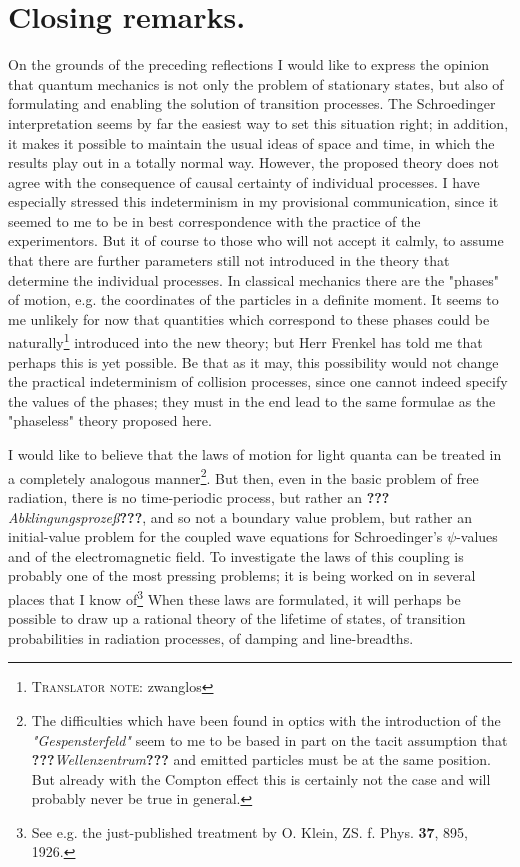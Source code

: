\documentclass[a4paper,11pt]{article}
\newcommand{\textbb}[1]{\textbf{#1}}
\newcommand{\WTF}[1]{\textbf{???}\textit{#1}\textbf{???}}
\newcommand{\?}[2]{#1\footnote{\textsc{Translator note}: #2}}
\begin{document}
\section{Closing remarks.} On the grounds of the preceding reflections I would like to express the opinion that quantum mechanics is not only the problem of stationary states, but also of formulating and enabling the solution of transition processes. The Schroedinger interpretation seems by far the easiest way to set this situation right; in addition, it makes it possible to maintain the usual ideas of space and time, in which the results play out in a totally normal way. However, the proposed theory does not agree with the consequence of causal certainty of individual processes. I have especially stressed this indeterminism in my provisional communication, since it seemed to me to be in best correspondence with the practice of the experimentors. But it of course to those who will not accept it calmly, to assume that there are further parameters still not introduced in the theory that determine the individual processes. In classical mechanics there are the "phases" of motion, e.g. the coordinates of the particles in a definite moment. It seems to me unlikely for now that quantities which correspond to these phases could be \?{naturally}{zwanglos} introduced into the new theory; but Herr Frenkel has told me that perhaps this is yet possible. Be that as it may, this possibility would not change the practical indeterminism of collision processes, since one cannot indeed specify the values of the phases; they must in the end lead to the same formulae as the "phaseless" theory proposed here.

I would like to believe that the laws of motion for light quanta can be treated in a completely analogous manner\footnote{The difficulties which have been found in optics with the introduction of the \textit{"Gespensterfeld"} seem to me to be based in part on the tacit assumption that \WTF{Wellenzentrum} and emitted particles must be at the same position. But already with the Compton effect this is certainly not the case and will probably never be true in general.}. But then, even in the basic problem of free radiation, there is no time-periodic process, but rather an \WTF{Abklingungsproze\ss}, and so not a boundary value problem, but rather an initial-value problem for the coupled wave equations for Schroedinger's $\psi$-values and of the electromagnetic field. To investigate the laws of this coupling is probably one of the most pressing problems; it is being worked on in several places that I know of\footnote{See e.g. the just-published treatment by O. Klein, ZS. f. Phys. \textbb{37}, 895, 1926.} When these laws are formulated, it will perhaps be possible to draw up a rational theory of the lifetime of states, of transition probabilities in radiation processes, of damping and line-breadths.
\end{document}
